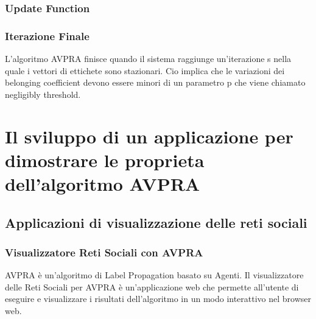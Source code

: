 \documentclass[a4paper,12pt]{report}
\begin{document}
		\subsection{Update Function}
		\subsection{Iterazione Finale}
		L'algoritmo AVPRA finisce quando il sistema raggiunge un'iterazione s nella quale i vettori di ettichete sono stazionari. Cio implica che le variazioni dei belonging coefficient devono essere minori di un parametro p che viene chiamato negligibly threshold. \par
		

\chapter[Il sviluppo dell'applicazione]{Il sviluppo di un applicazione per dimostrare le proprieta dell'algoritmo AVPRA}
\label{chapter4}

	\section{Applicazioni di visualizzazione delle reti sociali}
		
		\subsection{Visualizzatore Reti Sociali con AVPRA}
		AVPRA è un'algoritmo di Label Propagation basato su Agenti.
		Il visualizzatore delle Reti Sociali per AVPRA è un'applicazione web che permette all'utente di
		eseguire e visualizzare i risultati dell'algoritmo in un modo interattivo nel browser web. \par \cite{avpra}
		
\end{document}
